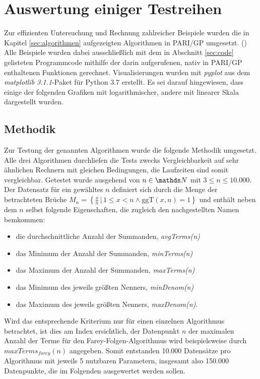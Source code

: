 \section{Auswertung einiger Testreihen}\label{sec:Testreihen}
Zur effizienten Untersuchung und Rechnung zahlreicher Beispiele wurden die in Kapitel \ref{sec:algorithmen} aufgezeigten Algorithmen in PARI/GP umgesetzt. (\cite{PARI2018})\\
Alle Beispiele wurden dabei ausschließlich mit dem in Abschnitt \ref{sec:code} gelisteten Programmcode \bzw mithilfe der darin aufgerufenen, nativ in PARI/GP enthaltenen Funktionen gerechnet.
Visualisierungen wurden mit \emph{pyplot} aus dem \emph{matplotlib 3.1.1}-Paket für Python 3.7 erstellt. Es sei darauf hingewiesen, dass einige der folgenden Grafiken mit logarithmischer, andere mit linearer Skala dargestellt wurden.

\subsection{Methodik}
Zur Testung der genannten Algorithmen wurde die folgende Methodik umgesetzt.
Alle drei Algorithmen durchliefen die Tests zwecks Vergleichbarkeit auf sehr ähnlichen Rechnern mit gleichen Bedingungen, die Laufzeiten sind somit vergleichbar.
Getestet wurde ausgehend von $n \in \N$ mit $3 \leq n \leq 10.000$.
Der Datensatz für ein gewähltes $n$ definiert sich durch die Menge der betrachteten Brüche $M_n = \left\{ \frac{x}{n} \, | \, 1\leq x < n \wedge \text{ggT}(x,n) = 1\right\}$ und enthält neben dem $n$ selbst folgende Eigenschaften, die zugleich den nachgestellten Namen bemkommen:
\begin{itemize}
	\item die durchschnittliche Anzahl der Summanden, \emph{avgTerms(n)}
	\item das Minimum der Anzahl der Summanden, \emph{minTerms(n)}
	\item das Maximum der Anzahl der Summanden, \emph{maxTerms(n)}
	\item das Minimum des jeweils größten Nenners, \emph{minDenom(n)}
	\item das Maximum des jeweils größten Nenners, \emph{maxDenom(n)}.
\end{itemize}
Wird das entsprechende Kriterium nur für einen einzelnen Algorithmus betrachtet, ist dies am Index ersichtlich, der Datenpunkt $n$ der maximalen Anzahl der Terme für den Farey-Folgen-Algorithmus wird beispielsweise durch $maxTerms_{farey}(n)$ angegeben.
Somit entstanden 10.000 Datensätze pro Algorithmus mit jeweils 5 nutzbaren Parametern, insgesamt also 150.000 Datenpunkte, die im Folgenden ausgewertet werden sollen.

